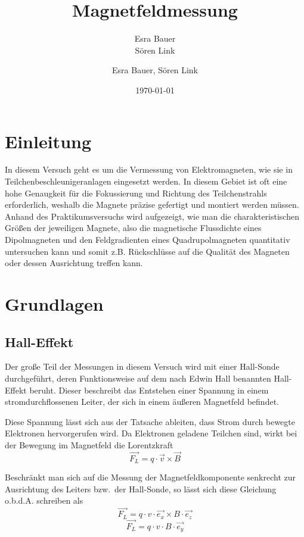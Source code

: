 \documentclass[bigchapter,colorback,accentcolor=tud4b,linedtoc,11pt]{tudreport}
\title{Magnetfeldmessung}
\subtitle{Esra Bauer  \\Sören Link}
\author{Esra Bauer, Sören Link}
\date{\today}
\begin{document}

\maketitle

\tableofcontents


\chapter{Einleitung}

In diesem Versuch geht es um die Vermessung von Elektromagneten, wie sie in Teilchenbeschleunigeranlagen eingesetzt werden. In diesem Gebiet ist oft eine hohe Genaugkeit für die Fokussierung und Richtung des Teilchenstrahls erforderlich, weshalb die Magnete präzise gefertigt und montiert werden müssen. Anhand  des Praktikumsversuchs wird aufgezeigt, wie man die charakteristischen Größen der jeweiligen Magnete, also die magnetische Flussdichte eines Dipolmagneten und den Feldgradienten eines Quadrupolmagneten quantitativ untersuchen kann und somit z.B. Rückschlüsse auf die Qualität des Magneten oder dessen Ausrichtung treffen kann.

\chapter{Grundlagen}
\section{Hall-Effekt}
Der große Teil der Messungen in diesem Versuch wird mit einer Hall-Sonde durchgeführt, deren Funktionsweise auf dem nach Edwin Hall benannten Hall-Effekt beruht. Dieser beschreibt das Entstehen einer Spannung in einem stromdurchflossenen Leiter, der sich in einem äußeren Magnetfeld befindet.

Diese Spannung lässt sich aus der Tatsache ableiten, dass Strom durch bewegte Elektronen hervorgerufen wird. Da Elektronen geladene Teilchen sind, wirkt bei der Bewegung im Magnetfeld die Lorentzkraft $$\vec{F_L} = q \cdot \vec{v} \times \vec{B}$$

Beschränkt man sich auf die Messung der Magnetfeldkomponente senkrecht zur Ausrichtung des Leiters bzw.\ der Hall-Sonde, so lässt sich diese Gleichung o.b.d.A. schreiben als
$$\vec{F_L} = q \cdot v \cdot \vec{e_x} \times B \cdot \vec{e_z}$$
$$\vec{F_L} = q \cdot v  \cdot B \cdot \vec{e_y}$$
\end{document}
